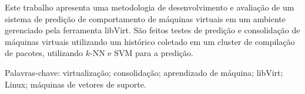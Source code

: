 \documentclass[font=plain,chapter=TITLE,section=Title,espaco=duplo,tocpage=plain,appendix=NAME,floatnumber=continuous]{abnt}
\begin{document}


\UTPCapa
\UTPFalsaFolhaDeRosto
\UTPFolhaDeRosto

\begin{resumo}
Este trabalho apresenta uma metodologia de desenvolvimento e avaliação de
um sistema de predição de comportamento de máquinas virtuais em um ambiente
gerenciado pela ferramenta libVirt. São feitos testes de predição e
consolidação de máquinas virtuais utilizando um histórico coletado em um
cluster de compilação de pacotes, utilizando $k$-NN e SVM para a predição.

Palavras-chave: virtualização; consolidação; aprendizado de máquina;
libVirt; Linux; máquinas de vetores de suporte.
\end{resumo}

\listoffigures
\listadequadros
\sumario




















\end{document}
